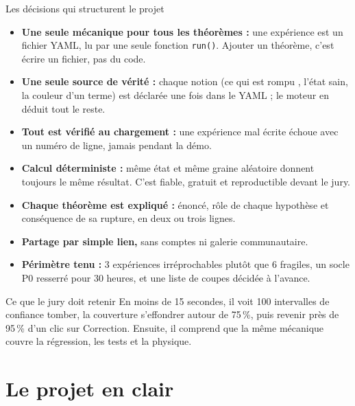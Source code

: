 \documentclass[11pt,a4paper]{article}
\begin{document}
\begin{keybox}{Les décisions qui structurent le projet}
\begin{itemize}[leftmargin=*, nosep]
  \item \textbf{Une seule mécanique pour tous les théorèmes :} une expérience est un fichier YAML, lu par une seule fonction \texttt{run()}. Ajouter un théorème, c'est écrire un fichier, pas du code.
  \item \textbf{Une seule source de vérité :} chaque notion (ce qui est \og rompu \fg{}, l'état sain, la couleur d'un terme) est déclarée une fois dans le YAML ; le moteur en déduit tout le reste.
  \item \textbf{Tout est vérifié au chargement :} une expérience mal écrite échoue avec un numéro de ligne, jamais pendant la démo.
  \item \textbf{Calcul déterministe :} même état et même graine aléatoire donnent toujours le même résultat. C'est fiable, gratuit et reproductible devant le jury.
  \item \textbf{Chaque théorème est expliqué :} énoncé, rôle de chaque hypothèse et conséquence de sa rupture, en deux ou trois lignes.
  \item \textbf{Partage par simple lien,} sans comptes ni galerie communautaire.
  \item \textbf{Périmètre tenu :} 3 expériences irréprochables plutôt que 6 fragiles, un socle P0 resserré pour 30 heures, et une liste de coupes décidée à l'avance.
\end{itemize}
\end{keybox}

\begin{rulebox}{Ce que le jury doit retenir}
En moins de 15 secondes, il voit 100 intervalles de confiance tomber, la couverture s'effondrer autour de 75\,\%, puis revenir près de 95\,\% d'un clic sur Correction. Ensuite, il comprend que la même mécanique couvre la régression, les tests et la physique.
\end{rulebox}

\newpage
\tableofcontents
\newpage

\section{Le projet en clair}
\end{document}
